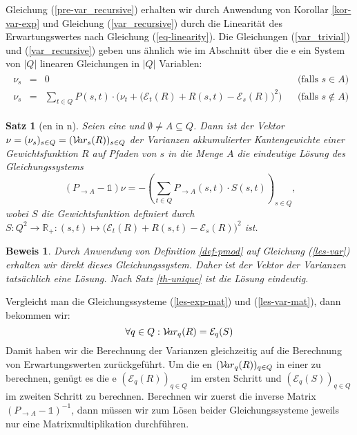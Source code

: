 \documentclass[a4paper]{article}
\newtheorem{satz}{Satz}[section] %
\theoremstyle{nonumberplain}
\newtheorem{beweis}{Beweis}
\begin{document}
Gleichung (\ref{pre-var_recursive}) erhalten wir durch Anwendung von Korollar \ref{kor-var-exp} und Gleichung (\ref{var_recursive}) durch die Linearität des Erwartungswertes nach Gleichung (\ref{eq-linearity}).
Die Gleichungen (\ref{var_trivial}) und (\ref{var_recursive}) geben uns ähnlich wie im Abschnitt über die \expect{}e ein System von $|Q|$ linearen Gleichungen in $|Q|$ Variablen:
\begin{align}
\begin{aligned}
	\nu_s & = & 0 && \text{(falls $s \in A$)}\\
	\nu_s & = & \sum_{t \in Q}{ P(s,t) \cdot \Big(\nu_t + \big(\mathcal{E}_{t}(R) + R(s,t) - \mathcal{E}_{s}(R)\big)^2\Big) } && \text{(falls $s \notin A$)}
\end{aligned}\label{les-var}
\end{align}

\begin{satz}[\var{}en in \mc{}n] \label{th-var}
		Seien \mcex{} eine \mc{} und $\emptyset \neq A\subseteq Q$. Dann ist der Vektor $\nu = (\nu_s)_{s \in Q } = (\mathcal{V}\!ar_{s}(R))_{s \in Q }$ der Varianzen akkumulierter Kantengewichte einer Gewichtsfunktion $R$ auf Pfaden von $s$ in die Menge $A$ die eindeutige Lösung des Gleichungssystems	
	\begin{equation}
	(P_{\rightarrow A} - \mathbb{1}) \nu = - \left(\sum_{t \in Q}{ P_{\rightarrow A}(s,t) \cdot S(s,t) }\right)_{s \in Q}\text{,}\label{les-var-mat}
	\end{equation}
	wobei $S$ die Gewichtsfunktion definiert durch $S: Q^2 \to \mathbb{R}_+ : (s,t) \mapsto \big(\mathcal{E}_{t}(R) + R(s,t) - \mathcal{E}_{s}(R)\big)^2$ ist.
\end{satz}
\begin{beweis}
	Durch Anwendung von Definition \ref{def-pmod} auf Gleichung (\ref{les-var}) erhalten wir direkt dieses Gleichungssystem. Daher ist der Vektor der Varianzen tatsächlich eine Lösung. Nach Satz \ref{th-unique} ist die Lösung eindeutig.
\end{beweis}

Vergleicht man die Gleichungssysteme (\ref{les-exp-mat}) und (\ref{les-var-mat}), dann bekommen wir:
\begin{equation}
\forall q \in Q : \mathcal{V}\!ar_q(R) = \mathcal{E}_q(S)
\end{equation}
Damit haben wir die Berechnung der Varianzen gleichzeitig auf die Berechnung von Erwartungswerten zurückgeführt. Um die \var{}en $(\mathcal{V}\!ar_q(R))_{q\in Q}$ in einer \mc{} zu berechnen, genügt es die \expect{}e $(\mathcal{E}_q(R))_{q\in Q}$ im ersten Schritt und $(\mathcal{E}_q(S))_{q\in Q}$ im zweiten Schritt zu berechnen. 
Berechnen wir zuerst die inverse Matrix $(P_{\rightarrow A} - \mathbb{1})^{-1}$, dann müssen wir zum Lösen beider Gleichungssysteme jeweils nur eine Matrixmultiplikation durchführen.
\end{document}

